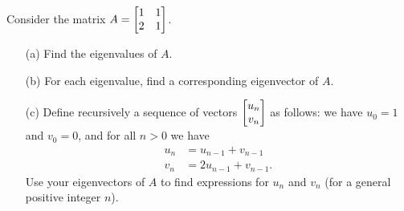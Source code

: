 \documentclass[a4paper]{amsart}
\begin{document}
\begin{exercise}\label{ex-diffeq-i}
 Consider the matrix $A=\left[\begin{matrix} 1 & 1 \\ 2 & 1 \end{matrix}\right]$.
 \begin{itemize}
  \item[(a)] Find the eigenvalues of $A$.
  \item[(b)] For each eigenvalue, find a corresponding eigenvector of
   $A$. 
  \item[(c)] Define recursively a sequence of vectors $\left[\begin{matrix}
   u_n\\v_n\end{matrix}\right]$ as follows: we have $u_0=1$ and $v_0=0$, and for all
   $n>0$ we have
   \begin{align*}
    u_n &= u_{n-1} + v_{n-1} \\
    v_n &= 2u_{n-1} + v_{n-1}.
   \end{align*}
   Use your eigenvectors of $A$ to find expressions for $u_n$ and
   $v_n$ (for a general positive integer $n$).
 \end{itemize}
\end{exercise}
\end{document}
